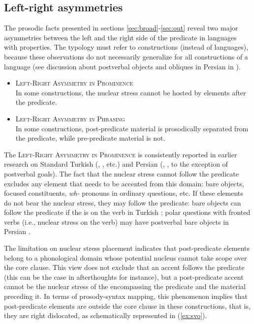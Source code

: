 \documentclass[output=paper,colorlinks,citecolor=brown]{langscibook}
\begin{document}
\subsection{Left-right asymmetries} 
The prosodic facts presented in sections \ref{sec:broad}-\ref{sec:out} reveal two major asymmetries between the left and the right side of the predicate in languages with  properties. The typology must refer to constructions (instead of languages), because these observations do not necessarily generalize for all constructions of a language (see discussion about postverbal objects and obliques in Persian in ).

\begin{itemize}
\item \textsc{Left-Right Asymmetry in Prominence}\\
  In some constructions, the nuclear stress cannot be hosted by elements after the predicate.
  \item \textsc{Left-Right Asymmetry in Phrasing}\\
  In some constructions, post-predicate material is prosodically separated from the predicate, while pre-predicate material is not.
\end{itemize}

\begin{sloppypar}
The \textsc{Left-Right Asymmetry in Prominence} is consistently reported in earlier research on Standard Turkish (\citealt[]{taylan_function_1984}, \citealt[]{issever_information_2003}, etc.) and Persian (\citealt[]{karimi_object_2003}, \citealt[]{sadat-tehrani_intonational_2007}, to the exception of postverbal goals). The fact that the nuclear stress cannot follow the predicate excludes any element that needs to be accented from this domain: bare objects, focused constituents, \textit{wh-} pronouns in ordinary questions, etc. If these elements do not bear the nuclear stress, they may follow the predicate: bare objects can follow the predicate if the  is on the verb in Turkish \citep[1047]{issever_information_2003}; polar questions with fronted verbs (i.e., nuclear stress on the verb) may have postverbal bare objects in Persian \citep[123]{karimi_object_2003}.
\end{sloppypar}

The limitation on nuclear stress placement indicates that post-predicate elements belong to a phonological domain whose potential nucleus cannot take scope over the core clause. This view does not exclude that an accent follows the predicate (this can be the case in afterthoughts for instance), but a post-predicate accent cannot be the nuclear stress of the  encompassing the predicate and the material preceding it. In terms of prosody-syntax mapping, this phenomenon implies that post-predicate elements are outside the core clause in these constructions, that is, they are right dislocated, as schematically represented in (\ref{ex:svo}).
\end{document}
